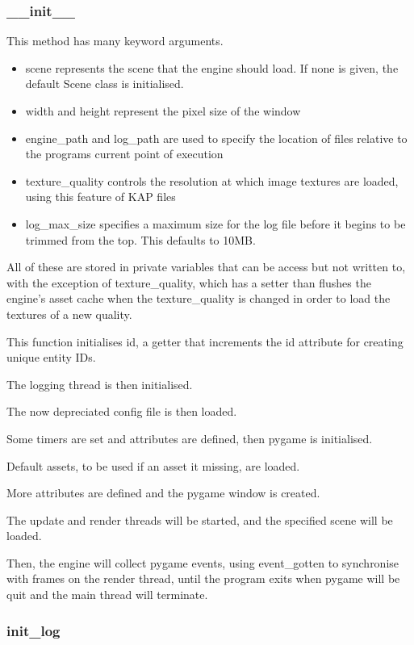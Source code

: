 \documentclass{report}
\begin{document}
\subsubsection{\_\_init\_\_}

This method has many keyword arguments.
\begin{itemize}
    \item scene represents the scene that the engine should load. If none is given, the default Scene class is initialised.
    \item width and height represent the pixel size of the window
    \item engine\_path and log\_path are used to specify the location of files relative to the programs current point of execution
    \item texture\_quality controls the resolution at which image textures are loaded, using this feature of KAP files
    \item log\_max\_size specifies a maximum size for the log file before it begins to be trimmed from the top. This defaults to 10MB.
\end{itemize}

All of these are stored in private variables that can be access but not written to, with the exception of texture\_quality, which has a setter than flushes the engine's asset cache when the texture\_quality is changed in order to load the textures of a new quality.

This function initialises id, a getter that increments the id attribute for creating unique entity IDs.

The logging thread is then initialised.

The now depreciated config file is then loaded.

Some timers are set and attributes are defined, then pygame is initialised.

Default assets, to be used if an asset it missing, are loaded.

More attributes are defined and the pygame window is created.

The update and render threads will be started, and the specified scene will be loaded.

Then, the engine will collect pygame events, using event\_gotten to synchronise with frames on the render thread, until the program exits when pygame will be quit and the main thread will terminate.

\subsubsection{init\_log}
\end{document}
